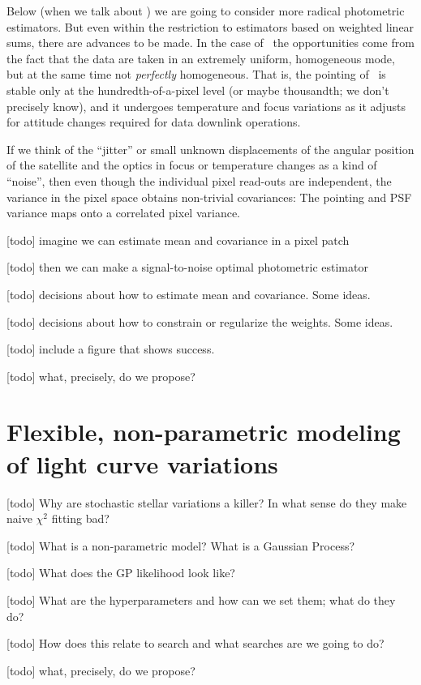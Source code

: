 \documentclass[letterpaper,12pt,preprint]{hack_aastex}
\begin{document}
Below (when we talk about \kpsf) we are going to consider more radical
photometric estimators.
But even within the restriction to estimators based on weighted linear sums,
there are advances to be made.
In the case of \Kepler\ the opportunities come from the fact that the data
are taken in an extremely uniform, homogeneous mode, but at the same time not
\emph{perfectly} homogeneous.
That is, the pointing of \Kepler\ is stable only at the hundredth-of-a-pixel
level (or maybe thousandth; we don't precisely know), and it undergoes
temperature and focus variations as it adjusts for attitude changes required
for data downlink operations.

If we think of the ``jitter'' or small unknown displacements of the angular
position of the satellite and the optics in focus or temperature changes as a
kind of ``noise'', then even though the individual pixel read-outs are
independent, the variance in the pixel space obtains non-trivial covariances:
The pointing and PSF variance maps onto a correlated pixel variance.

[todo] imagine we can estimate mean and covariance in a pixel patch

[todo] then we can make a signal-to-noise optimal photometric estimator

[todo] decisions about how to estimate mean and covariance.  Some ideas.

[todo] decisions about how to constrain or regularize the weights.  Some ideas.

[todo] include a figure that shows success.

[todo] what, precisely, do we propose?

\section{Flexible, non-parametric modeling of light curve variations}

[todo] Why are stochastic stellar variations a killer?  In what sense do they make naive $\chi^2$ fitting bad?

[todo] What is a non-parametric model?  What is a Gaussian Process?

[todo] What does the GP likelihood look like?

[todo] What are the hyperparameters and how can we set them; what do they do?

[todo] How does this relate to search and what searches are we going to do?

[todo] what, precisely, do we propose?
\end{document}

